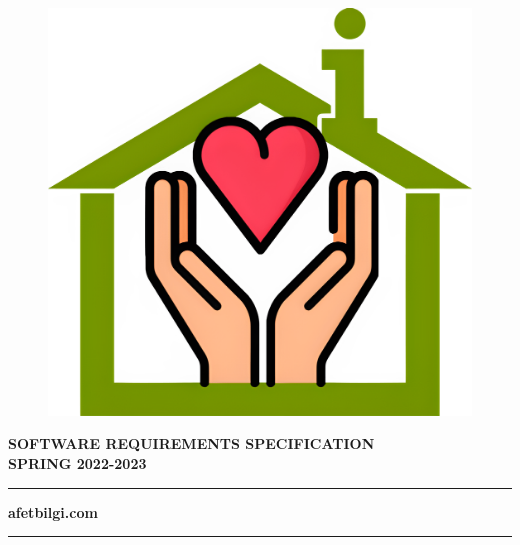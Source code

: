 \begin{titlepage}
\begin{center}
  \begin{figure}[ht]
    \centering
    \includegraphics[width=.5\linewidth]{img/afetbilgi.jpg}
  \end{figure}

  \vspace{16pt}
  \large{
    \textbf{SOFTWARE REQUIREMENTS SPECIFICATION}
  } \\
  \large{
    \textbf{SPRING 2022-2023}
  }

  \rule{12cm}{1pt}
  \vspace{-7pt}
  \large{\textbf{afetbilgi.com}}
  \rule{12cm}{1pt}

  \vspace{48pt}
  \begin{minipage}{.45\textwidth}
    \centering
  \end{minipage}
  \hfill
  \begin{minipage}{.45\textwidth}
    \centering
  \end{minipage}
  
  \end{center}
\end{titlepage}
  
